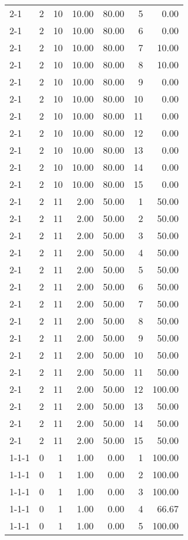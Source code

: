 \begin{tabular}{lrrrrrr}
2-1  & 2 & 10 & 10.00 & 80.00 & 5 & 0.00 \\
2-1  & 2 & 10 & 10.00 & 80.00 & 6 & 0.00 \\
2-1  & 2 & 10 & 10.00 & 80.00 & 7 & 10.00 \\
2-1  & 2 & 10 & 10.00 & 80.00 & 8 & 10.00 \\
2-1  & 2 & 10 & 10.00 & 80.00 & 9 & 0.00 \\
2-1  & 2 & 10 & 10.00 & 80.00 & 10 & 0.00 \\
2-1  & 2 & 10 & 10.00 & 80.00 & 11 & 0.00 \\
2-1  & 2 & 10 & 10.00 & 80.00 & 12 & 0.00 \\
2-1  & 2 & 10 & 10.00 & 80.00 & 13 & 0.00 \\
2-1  & 2 & 10 & 10.00 & 80.00 & 14 & 0.00 \\
2-1  & 2 & 10 & 10.00 & 80.00 & 15 & 0.00 \\
2-1  & 2 & 11 & 2.00 & 50.00 & 1 & 50.00 \\
2-1  & 2 & 11 & 2.00 & 50.00 & 2 & 50.00 \\
2-1  & 2 & 11 & 2.00 & 50.00 & 3 & 50.00 \\
2-1  & 2 & 11 & 2.00 & 50.00 & 4 & 50.00 \\
2-1  & 2 & 11 & 2.00 & 50.00 & 5 & 50.00 \\
2-1  & 2 & 11 & 2.00 & 50.00 & 6 & 50.00 \\
2-1  & 2 & 11 & 2.00 & 50.00 & 7 & 50.00 \\
2-1  & 2 & 11 & 2.00 & 50.00 & 8 & 50.00 \\
2-1  & 2 & 11 & 2.00 & 50.00 & 9 & 50.00 \\
2-1  & 2 & 11 & 2.00 & 50.00 & 10 & 50.00 \\
2-1  & 2 & 11 & 2.00 & 50.00 & 11 & 50.00 \\
2-1  & 2 & 11 & 2.00 & 50.00 & 12 & 100.00 \\
2-1  & 2 & 11 & 2.00 & 50.00 & 13 & 50.00 \\
2-1  & 2 & 11 & 2.00 & 50.00 & 14 & 50.00 \\
2-1  & 2 & 11 & 2.00 & 50.00 & 15 & 50.00 \\
1-1-1 & 0 & 1 & 1.00 & 0.00 & 1 & 100.00 \\
1-1-1 & 0 & 1 & 1.00 & 0.00 & 2 & 100.00 \\
1-1-1 & 0 & 1 & 1.00 & 0.00 & 3 & 100.00 \\
1-1-1 & 0 & 1 & 1.00 & 0.00 & 4 & 66.67 \\
1-1-1 & 0 & 1 & 1.00 & 0.00 & 5 & 100.00 \\

\end{tabular}
